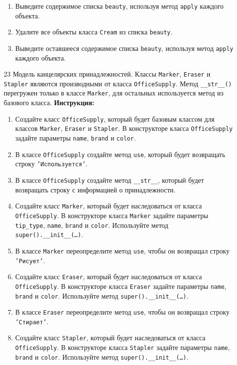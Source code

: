 \begin{enumerate}
\begin{enumerate}
    \item Выведите содержимое списка \texttt{beauty}, используя метод \texttt{apply} каждого объекта.
    \item Удалите все объекты класса \texttt{Cream} из списка \texttt{beauty}.
    \item Выведите оставшееся содержимое списка \texttt{beauty}, используя метод \texttt{apply} каждого объекта.
\end{enumerate}
\item[23]
Модель канцелярских принадлежностей. Классы \texttt{Marker}, \texttt{Eraser} и \texttt{Stapler} являются производными от класса \texttt{OfficeSupply}. Метод \texttt{\_\_str\_\_()} перегружен только в классе \texttt{Marker}, для остальных используется метод из базового класса.
\textbf{Инструкция:}
\begin{enumerate}
    \item Создайте класс \texttt{OfficeSupply}, который будет базовым классом для классов \texttt{Marker}, \texttt{Eraser} и \texttt{Stapler}. В конструкторе класса \texttt{OfficeSupply} задайте параметры \texttt{name}, \texttt{brand} и \texttt{color}.
    \item В классе \texttt{OfficeSupply} создайте метод \texttt{use}, который будет возвращать строку \texttt{'Используется'}.
    \item В классе \texttt{OfficeSupply} создайте метод \texttt{\_\_str\_\_}, который будет возвращать строку с информацией о принадлежности.
    \item Создайте класс \texttt{Marker}, который будет наследоваться от класса \texttt{OfficeSupply}. В конструкторе класса \texttt{Marker} задайте параметры \texttt{tip\_type}, \texttt{name}, \texttt{brand} и \texttt{color}. Используйте метод \texttt{super().\_\_init\_\_(\ldots)}.
    \item В классе \texttt{Marker} переопределите метод \texttt{use}, чтобы он возвращал строку \texttt{'Рисует'}.
    \item Создайте класс \texttt{Eraser}, который будет наследоваться от класса \texttt{OfficeSupply}. В конструкторе класса \texttt{Eraser} задайте параметры \texttt{name}, \texttt{brand} и \texttt{color}. Используйте метод \texttt{super().\_\_init\_\_(\ldots)}.
    \item В классе \texttt{Eraser} переопределите метод \texttt{use}, чтобы он возвращал строку \texttt{'Стирает'}.
    \item Создайте класс \texttt{Stapler}, который будет наследоваться от класса \texttt{OfficeSupply}. В конструкторе класса \texttt{Stapler} задайте параметры \texttt{name}, \texttt{brand} и \texttt{color}. Используйте метод \texttt{super().\_\_init\_\_(\ldots)}.

\end{enumerate}
\end{enumerate}
